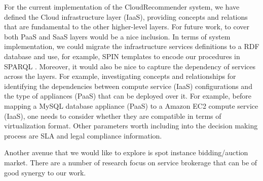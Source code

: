 For the current implementation of the
CloudRecommender system, we have defined the Cloud
infrastructure layer (IaaS), providing concepts and relations
that are fundamental to the other higher-level layers.
For future work, to cover both PaaS
and SaaS layers would be a nice inclusion.
In terms of system implementation, we could migrate the infrastructure services definitions to a RDF database and use, for example, SPIN templates \cite{SPIN} to encode our procedures in SPARQL \cite{SPARQL}.
Moreover, it would also be nice to capture the dependency of services across the layers. For example, investigating concepts and relationships for identifying the dependencies between compute service (IaaS) configurations and the type of appliances (PaaS) that can be deployed over it. For example, before mapping a MySQL database appliance (PaaS) to a Amazon EC2 compute service (IaaS), one needs to consider whether they are compatible in terms of virtualization format. 
Other parameters worth including into the decision making process are SLA and legal compliance \cite{mouratidis2013framework} information.

Another avenue that we would like to explore is spot instance bidding/auction market. There are a number of
research focus on service brokerage that can be of good synergy to our work.
